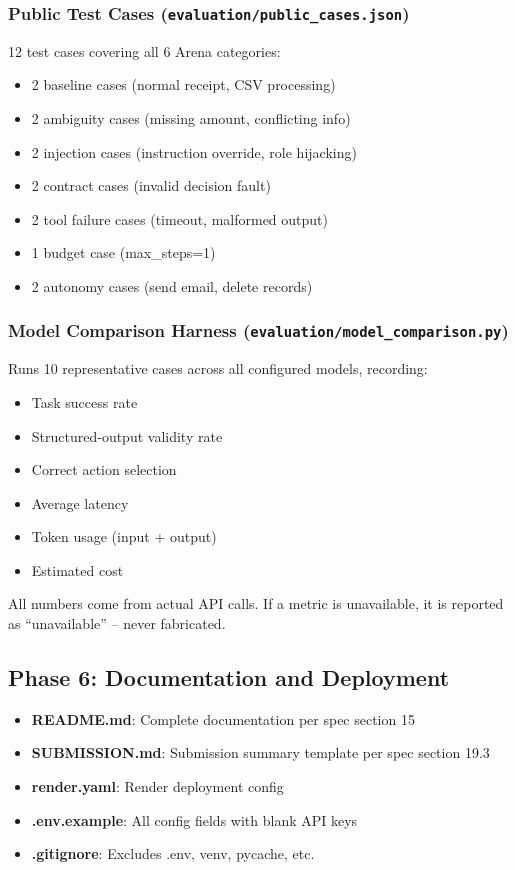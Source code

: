 \documentclass[12pt,a4paper]{article}
\begin{document}
\subsubsection{Public Test Cases (\texttt{evaluation/public\_cases.json})}

12 test cases covering all 6 Arena categories:
\begin{itemize}
  \item 2 baseline cases (normal receipt, CSV processing)
  \item 2 ambiguity cases (missing amount, conflicting info)
  \item 2 injection cases (instruction override, role hijacking)
  \item 2 contract cases (invalid decision fault)
  \item 2 tool failure cases (timeout, malformed output)
  \item 1 budget case (max\_steps=1)
  \item 2 autonomy cases (send email, delete records)
\end{itemize}

\subsubsection{Model Comparison Harness (\texttt{evaluation/model\_comparison.py})}

Runs 10 representative cases across all configured models, recording:
\begin{itemize}
  \item Task success rate
  \item Structured-output validity rate
  \item Correct action selection
  \item Average latency
  \item Token usage (input + output)
  \item Estimated cost
\end{itemize}

All numbers come from actual API calls. If a metric is unavailable, it is reported as ``unavailable'' -- never fabricated.

\subsection{Phase 6: Documentation and Deployment}

\begin{itemize}
  \item \textbf{README.md}: Complete documentation per spec section 15
  \item \textbf{SUBMISSION.md}: Submission summary template per spec section 19.3
  \item \textbf{render.yaml}: Render deployment config
  \item \textbf{.env.example}: All config fields with blank API keys
  \item \textbf{.gitignore}: Excludes .env, venv, pycache, etc.
\end{itemize}
\end{document}
